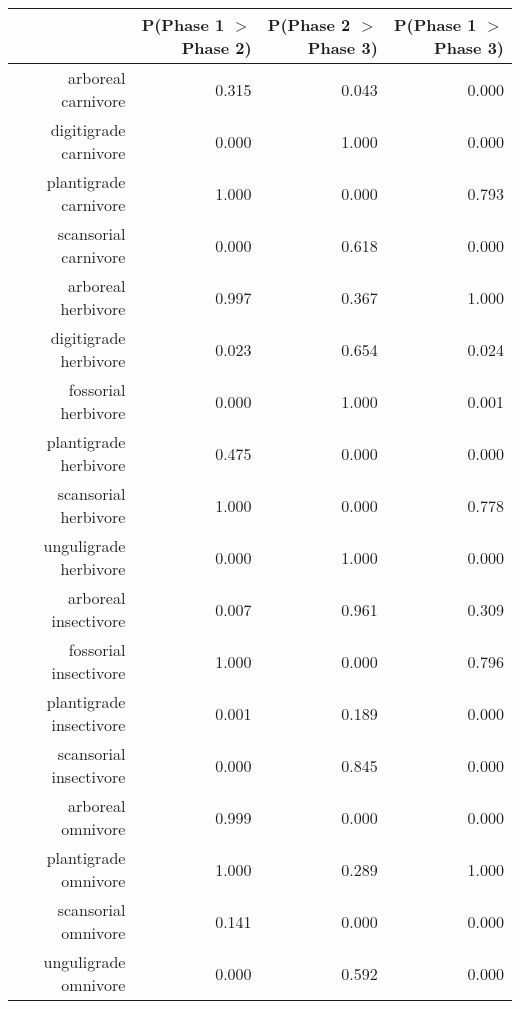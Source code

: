 \begin{table}[ht]
\centering
\begin{tabular}{rrrr}
  \hline
 & P(Phase 1 $>$ Phase 2) & P(Phase 2 $>$ Phase 3) & P(Phase 1 $>$ Phase 3) \\ 
  \hline
arboreal carnivore & 0.315 & 0.043 & 0.000 \\ 
  digitigrade carnivore & 0.000 & 1.000 & 0.000 \\ 
  plantigrade carnivore & 1.000 & 0.000 & 0.793 \\ 
  scansorial carnivore & 0.000 & 0.618 & 0.000 \\ 
  arboreal herbivore & 0.997 & 0.367 & 1.000 \\ 
  digitigrade herbivore & 0.023 & 0.654 & 0.024 \\ 
  fossorial herbivore & 0.000 & 1.000 & 0.001 \\ 
  plantigrade herbivore & 0.475 & 0.000 & 0.000 \\ 
  scansorial herbivore & 1.000 & 0.000 & 0.778 \\ 
  unguligrade herbivore & 0.000 & 1.000 & 0.000 \\ 
  arboreal insectivore & 0.007 & 0.961 & 0.309 \\ 
  fossorial insectivore & 1.000 & 0.000 & 0.796 \\ 
  plantigrade insectivore & 0.001 & 0.189 & 0.000 \\ 
  scansorial insectivore & 0.000 & 0.845 & 0.000 \\ 
  arboreal omnivore & 0.999 & 0.000 & 0.000 \\ 
  plantigrade omnivore & 1.000 & 0.289 & 1.000 \\ 
  scansorial omnivore & 0.141 & 0.000 & 0.000 \\ 
  unguligrade omnivore & 0.000 & 0.592 & 0.000 \\ 
   \hline
\end{tabular}
\label{tab:occur_plant}
\end{table}
